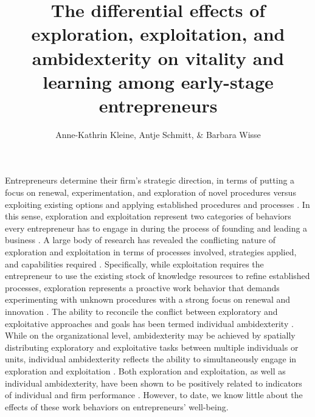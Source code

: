 \documentclass[man, 12pt, a4paper, noextraspace]{apa6}
\title{The differential effects of exploration, exploitation, and ambidexterity on vitality and learning among early-stage entrepreneurs}
\author{Anne-Kathrin Kleine, Antje Schmitt, \& Barbara Wisse}
\affiliation{University of Groningen}
\begin{document}
\maketitle

Entrepreneurs determine their firm's strategic direction, in terms of putting a focus on renewal, experimentation, and exploration of novel procedures versus exploiting existing options and applying established procedures and processes \parencite{Siren.2012, Ireland2009, Webb2010}. 
In this sense, exploration and exploitation represent two categories of behaviors every entrepreneur has to engage in during the process of founding and leading a business \parencite[e.g.,][]{Rosing.2017, DuaneIreland2007, Siren.2012}. 
A large body of research has revealed the conflicting nature of exploration and exploitation in terms of processes involved, strategies applied, and capabilities required \parencite[e.g.,][]{He2004}.
Specifically, while exploitation requires the entrepreneur to use the existing stock of knowledge resources to refine established processes, exploration represents a proactive work behavior that demands experimenting with unknown procedures with a strong focus on renewal and innovation \parencite[e.g.,][]{Mom.2007}.
The ability to reconcile the conflict between exploratory and exploitative approaches and goals has been termed individual ambidexterity \parencite[e.g.,][]{Mom.2007}. 
While on the organizational level, ambidexterity may be achieved by spatially distributing exploratory and exploitative tasks between multiple individuals or units, individual ambidexterity reflects the ability to simultaneously engage in exploration and exploitation \parencite{He2004, Good.2013}. 
Both exploration and exploitation, as well as individual ambidexterity, have been shown to be positively related to indicators of individual and firm performance \parencite[e.g.,][]{Rosing.2017, Vicentini.2019, Mom.2018}.
However, to date, we know little about the effects of these work behaviors on entrepreneurs' well-being. \par 
\end{document}
